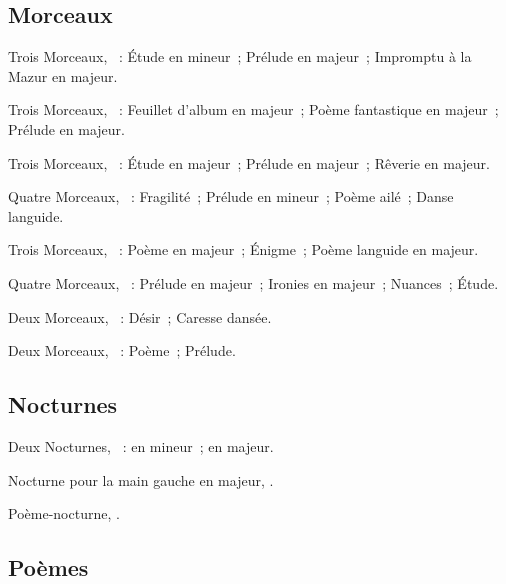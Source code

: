 \subsection{Morceaux}


Trois Morceaux, ~:  Étude en \kC \Sharp mineur~;
 Prélude en \kB majeur~;  Impromptu à la Mazur en \kC
majeur.

Trois Morceaux, ~:  Feuillet d'album en \kE \Flat
majeur~;  Poème fantastique en \kC majeur~;  Prélude en
\kE \Flat majeur.

Trois Morceaux, ~:  Étude en \kE \Flat majeur~;
 Prélude en \kF majeur~;  Rêverie en \kC majeur.

Quatre Morceaux, ~:  Fragilité~;  Prélude en
\kA mineur~;  Poème ailé~;  Danse languide.

Trois Morceaux, ~:  Poème en \kC majeur~; 
Énigme~;  Poème languide en \kB majeur.

Quatre Morceaux, ~:  Prélude en \kE \Flat majeur~;
 Ironies en \kC majeur~;  Nuances~;  Étude.

Deux Morceaux, ~:  Désir~;  Caresse dansée.

Deux Morceaux, ~:  Poème~;  Prélude.

\subsection{Nocturnes}

Deux Nocturnes, ~:  en \kF \Sharp mineur~;  en
\kA majeur.

Nocturne pour la main gauche en \kD \Flat majeur,  .

Poème-nocturne, .

\subsection{Poèmes}


